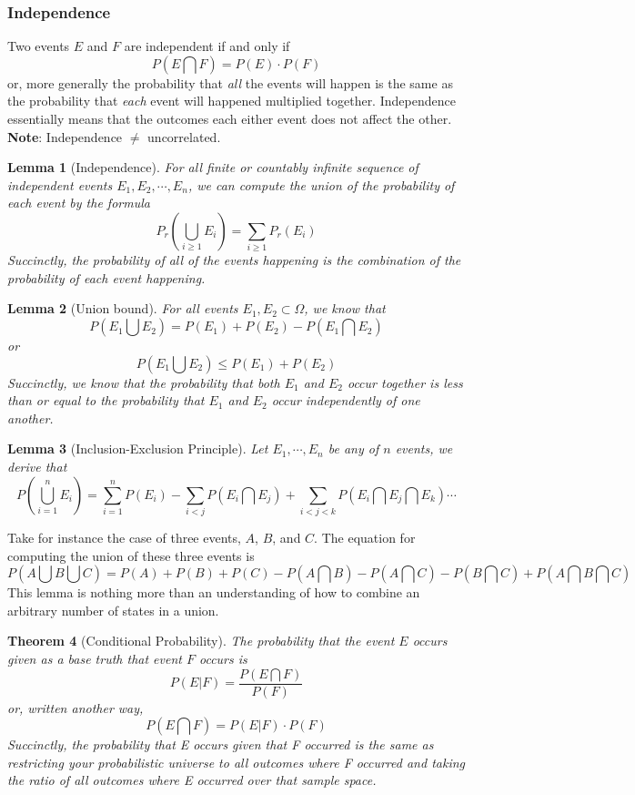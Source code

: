 \documentclass[12pt]{article}
\newcommand{\skln}{\\[\baselineskip]}
\newtheorem{theorem}{Theorem}[section]
\newtheorem{lemma}[theorem]{Lemma}
\begin{document}
\subsubsection{Independence}

Two events $E$ and $F$ are independent if and only if \[P(E \bigcap F) = P(E) \cdot P(F)\] or, more generally the probability that \textit{all} the events will happen is the same as the probability that \textit{each} event will happened multiplied together. Independence essentially means that the outcomes each either event does not affect the other.
\skln
\textbf{Note}: Independence $\neq$ uncorrelated.

\begin{lemma}[Independence]
For all finite or countably infinite sequence of independent events $E_1, E_2, \cdots, E_n$, we can compute the union of the probability of each event by the formula \[P_r(\bigcup\limits_{i \ge 1} E_{i}) = \sum\limits_{i \ge 1}P_r(E_i)\]Succinctly, the probability of all of the events happening is the combination of the probability of each event happening.
\end{lemma}

\begin{lemma}[Union bound]

For all events $E_1, E_2 \subset \Omega$, we know that \[P(E_1 \bigcup E_2) = P(E_1) + P(E_2) - P (E_1 \bigcap E_2)\] or \[P(E_1 \bigcup E_2) \le P(E_1) + P(E_2)\]Succinctly, we know that the probability that both $E_1$ and $E_2$ occur together is less than or equal to the probability that $E_1$ and $E_2$ occur independently of one another.
\end{lemma}

\begin{lemma}[Inclusion-Exclusion Principle]
Let $E_1, \cdots, E_n$ be any of $n$ events, we derive that \[P(\bigcup \limits_{i=1}^{n} E_i) = \sum\limits_{i=1}^{n} P(E_i) - \sum\limits_{i < j} P(E_i \bigcap E_j) + \sum\limits_{i < j < k} P(E_i \bigcap E_j \bigcap E_k) \cdots\]
\end{lemma}

Take for instance the case of three events, $A$, $B$, and $C$. The equation for computing the union of these three events is \[P(A \bigcup B \bigcup C) = P(A) + P(B) + P(C) - P(A \bigcap B) - P(A \bigcap C) - P(B \bigcap C) + P(A \bigcap B \bigcap C)\]This lemma is nothing more than an understanding of how to combine an arbitrary number of states in a union.

\begin{theorem}[Conditional Probability]
The probability that the event $E$ occurs given as a base truth that event $F$ occurs is \[P(E | F) = \frac{P(E \bigcap F)}{P(F)}\] or, written another way, \[P(E \bigcap F) = P(E | F) \cdot P(F)\]Succinctly, the probability that E occurs given that F occurred is the same as restricting your probabilistic universe to all outcomes where F occurred and taking the ratio of all outcomes where E occurred over that sample space.
\end{theorem}
\end{document}
